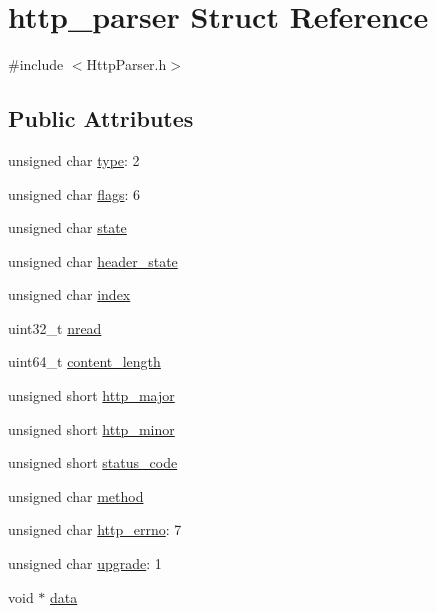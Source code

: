 \hypertarget{structhttp__parser}{}\section{http\+\_\+parser Struct Reference}
\label{structhttp__parser}


{\ttfamily \#include $<$Http\+Parser.\+h$>$}

\subsection*{Public Attributes}
\begin{DoxyCompactItemize}
\item 
unsigned char \hyperlink{structhttp__parser_a20b4326f0a092ca2261b32ce22f0d296}{type}\+: 2
\item 
unsigned char \hyperlink{structhttp__parser_ad4f41ca1e40e3ee7de2fc74ad3f80dd5}{flags}\+: 6
\item 
unsigned char \hyperlink{structhttp__parser_a1e39f73146ee7cb9774482180c693d6b}{state}
\item 
unsigned char \hyperlink{structhttp__parser_a9d64389160150bfad8398140a38fe8e8}{header\+\_\+state}
\item 
unsigned char \hyperlink{structhttp__parser_ae1d04bd4da968b103e3ae91c8ee8b834}{index}
\item 
uint32\+\_\+t \hyperlink{structhttp__parser_a78085ca896bb3b9aa1ecb0f6fddc039d}{nread}
\item 
uint64\+\_\+t \hyperlink{structhttp__parser_a7fd5a194802b1206bb773e096d291f29}{content\+\_\+length}
\item 
unsigned short \hyperlink{structhttp__parser_ac994a4a8268652f5ce82de5bde5c3f9d}{http\+\_\+major}
\item 
unsigned short \hyperlink{structhttp__parser_ae8af6433c824f5348773842db62ad4ab}{http\+\_\+minor}
\item 
unsigned short \hyperlink{structhttp__parser_a6aaeac3a79271169cd0902992820a9c5}{status\+\_\+code}
\item 
unsigned char \hyperlink{structhttp__parser_a28532af3774532c797ce32cbc128accd}{method}
\item 
unsigned char \hyperlink{structhttp__parser_a098a1fdf277d5dadaa8e52f17d81c5e5}{http\+\_\+errno}\+: 7
\item 
unsigned char \hyperlink{structhttp__parser_a4eeddd444d2c6a9bf1d0fbdf3280dd70}{upgrade}\+: 1
\item 
void $\ast$ \hyperlink{structhttp__parser_ad4390e0a9448e02a19c4dffded033e3a}{data}
\end{DoxyCompactItemize}


